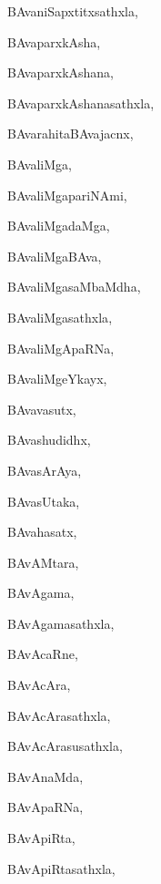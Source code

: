 \begin{multicols}{3}
{\noindent
{BAvaniSapxtitxsathxla}, \pageref{BAvaniSapxtitxsathxla}

\noindent
{BAvaparxkAsha}, \pageref{BAvaparxkAsha}

\noindent
{BAvaparxkAshana}, \pageref{BAvaparxkAshana}

\noindent
{BAvaparxkAshanasathxla}, \pageref{BAvaparxkAshanasathxla}

\noindent
{BAvarahitaBAvajacnx}, \pageref{BAvarahitaBAvajacnx}

\noindent
{BAvaliMga}, \pageref{BAvaliMga}

\noindent
{BAvaliMgapariNAmi}, \pageref{BAvaliMgapariNAmi}

\noindent
{BAvaliMgadaMga}, \pageref{BAvaliMgadaMga}

\noindent
{BAvaliMgaBAva}, \pageref{BAvaliMgaBAva}

\noindent
{BAvaliMgasaMbaMdha}, \pageref{BAvaliMgasaMbaMdha}

\noindent
{BAvaliMgasathxla}, \pageref{BAvaliMgasathxla}

\noindent
{BAvaliMgApaRNa}, \pageref{BAvaliMgApaRNa}

\noindent
{BAvaliMgeYkayx}, \pageref{BAvaliMgeYkayx}

\noindent
{BAvavasutx}, \pageref{BAvavasutx}

\noindent
{BAvashudidhx}, \pageref{BAvashudidhx}

\noindent
{BAvasArAya}, \pageref{BAvasArAya}

\noindent
{BAvasUtaka}, \pageref{BAvasUtaka}

\noindent
{BAvahasatx}, \pageref{BAvahasatx}

\noindent
{BAvAMtara}, \pageref{BAvAMtara}

\noindent
{BAvAgama}, \pageref{BAvAgama}

\noindent
{BAvAgamasathxla}, \pageref{BAvAgamasathxla}

\noindent
{BAvAcaRne}, \pageref{BAvAcaRne}

\noindent
{BAvAcAra}, \pageref{BAvAcAra}

\noindent
{BAvAcArasathxla}, \pageref{BAvAcArasathxla}

\noindent
{BAvAcArasusathxla}, \pageref{BAvAcArasusathxla}

\noindent
{BAvAnaMda}, \pageref{BAvAnaMda}

\noindent
{BAvApaRNa}, \pageref{BAvApaRNa}

\noindent
{BAvApiRta}, \pageref{BAvApiRta}

\noindent
{BAvApiRtasathxla}, \pageref{BAvApiRtasathxla}

}
\end{multicols}
